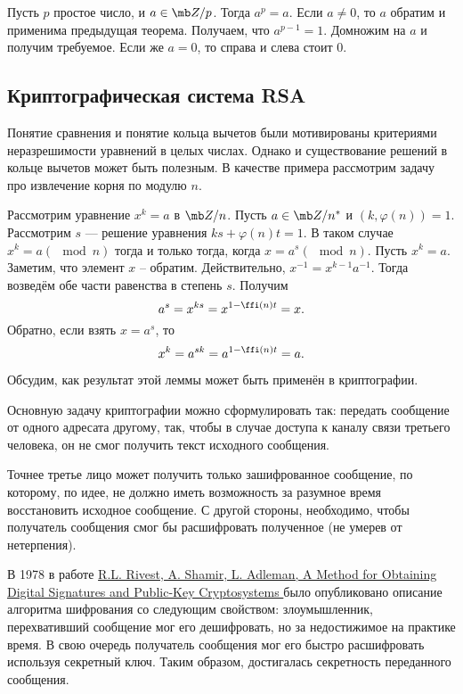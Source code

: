 \endproof


 Пусть $p$ простое число, и $a\in \mb Z/p$. Тогда $a^{p} = a$.
\ecrl
\proof Если $a\neq 0$, то $a$ обратим и применима предыдущая теорема. Получаем, что $a^{p-1}=1$. Домножим на $a$ и получим требуемое. Если же $a=0$, то справа и слева стоит 0. 
\endproof






\subsection{Криптографическая система RSA}
Понятие сравнения и понятие кольца вычетов были мотивированы критериями неразрешимости уравнений в целых числах. Однако и существование решений в кольце вычетов может быть полезным. В качестве примера рассмотрим задачу про извлечение корня по модулю $n$.

\lm Рассмотрим уравнение  $x^k=a$ в $\mb Z/n$. Пусть $a\in \mb Z/n^*$ и $(k,\varphi(n))=1$.
Рассмотрим $s$ ---  решение уравнения $ks+\varphi(n)t=1$. В таком случае $x^k=a (\mod n)$ тогда и только тогда, когда $x=a^s(\mod n)$.
\proof
Пусть $x^k=a$. Заметим, что элемент $x$ -- обратим. Действительно, $x^{-1}=x^{k-1}a^{-1}$. Тогда возведём обе части равенства в степень $s$. Получим 
$$a^s=x^{ks}=x^{1-\ffi(n)t}=x.$$
Обратно, если взять $x=a^s$, то
$$x^k=a^{sk}=a^{1-\ffi(n)t}=a.$$
\endproof
\elm

Обсудим, как результат этой леммы может быть применён в криптографии.

Основную задачу криптографии можно сформулировать так: передать сообщение от одного адресата другому, так, чтобы в случае доступа к каналу связи третьего человека, он не смог получить текст исходного сообщения. 

Точнее третье лицо может получить только зашифрованное сообщение, по которому, по идее, не должно иметь возможность за разумное время восстановить исходное сообщение. С другой стороны, необходимо, чтобы получатель сообщения смог бы расшифровать полученное (не умерев от нетерпения).




В 1978 в работе \href{http://people.csail.mit.edu/rivest/Rsapaper.pdf}{ R.L. Rivest, A. Shamir, L. Adleman, A Method for Obtaining Digital Signatures and Public-Key Cryptosystems } было опубликовано описание алгоритма шифрования со следующим свойством: злоумышленник, перехвативший сообщение мог его дешифровать, но за недостижимое на практике время. В свою очередь получатель сообщения мог его быстро расшифровать используя секретный ключ. Таким образом, достигалась секретность переданного сообщения.



